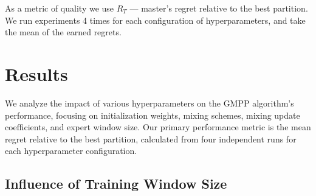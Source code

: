\documentclass[12pt, twoside]{article}
\begin{document}
As a metric of quality we use $R_T$ --- master's regret relative to the best partition.
We run experiments 4 times for each configuration of hyperparameters, and take the mean of the earned regrets.

\newpage
\section{Results}

We analyze the impact of various hyperparameters on the GMPP algorithm's performance, focusing on initialization weights, mixing schemes, mixing update coefficients, and expert window size. Our primary performance metric is the mean regret relative to the best partition, calculated from four independent runs for each hyperparameter configuration.




\subsection{Influence of Training Window Size}

%
%

%
\end{document}
